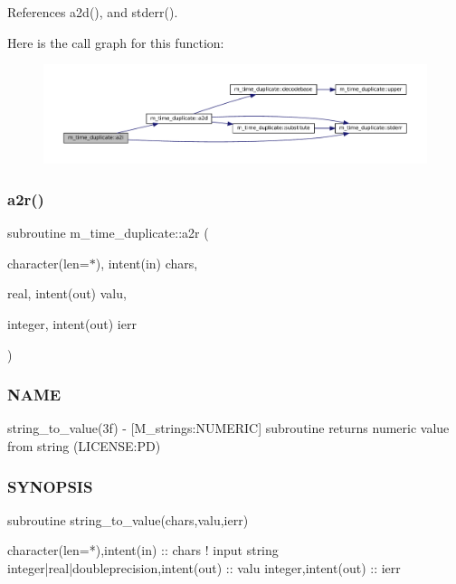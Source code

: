 References a2d(), and stderr().

Here is the call graph for this function\+:\nopagebreak
\begin{figure}[H]
\begin{center}
\leavevmode
\includegraphics[width=350pt]{namespacem__time__duplicate_aaf8891d2fdbd165fecbdf78335f926fc_cgraph}
\end{center}
\end{figure}
\mbox{\label{namespacem__time__duplicate_a9e2a87974ffb9b81dcfb0ecee076180f}} 
\subsubsection{\texorpdfstring{a2r()}{a2r()}}
{\footnotesize\ttfamily subroutine m\+\_\+time\+\_\+duplicate\+::a2r (\begin{DoxyParamCaption}\item[{character(len=$\ast$), intent(in)}]{chars,  }\item[{real, intent(out)}]{valu,  }\item[{integer, intent(out)}]{ierr }\end{DoxyParamCaption})}



\subsubsection*{N\+A\+ME}

string\+\_\+to\+\_\+value(3f) -\/ \mbox{[}M\+\_\+strings\+:N\+U\+M\+E\+R\+IC\mbox{]} subroutine returns numeric value from string (L\+I\+C\+E\+N\+SE\+:PD) 

\subsubsection*{S\+Y\+N\+O\+P\+S\+IS}

\begin{DoxyVerb}subroutine string_to_value(chars,valu,ierr)

 character(len=*),intent(in)              :: chars   ! input string
 integer|real|doubleprecision,intent(out) :: valu
 integer,intent(out)                      :: ierr
\end{DoxyVerb}
